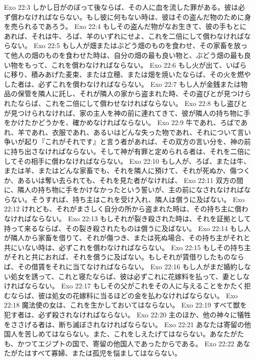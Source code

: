Exo 22:3  しかし日がのぼって後ならば、その人に血を流した罪がある。彼は必ず償わなければならない。もし彼に何もない時は、彼はその盗んだ物のために身を売られるであろう。
Exo 22:4  もしその盗んだ物がなお生きて、彼の手もとにあれば、それは牛、ろば、羊のいずれにせよ、これを二倍にして償わなければならない。
Exo 22:5  もし人が畑またはぶどう畑のものを食わせ、その家畜を放って他人の畑のものを食わせた時は、自分の畑の最も良い物と、ぶどう畑の最も良い物をもって、これを償わなければならない。
Exo 22:6  もし火が出て、いばらに移り、積みあげた麦束、または立穂、または畑を焼いたならば、その火を燃やした者は、必ずこれを償わなければならない。
Exo 22:7  もし人が金銭または物品の保管を隣人に託し、それが隣人の家から盗まれた時、その盗びとが見つけられたならば、これを二倍にして償わせなければならない。
Exo 22:8  もし盗びとが見つけられなければ、家の主人を神の前に連れてきて、彼が隣人の持ち物に手をかけたかどうかを、確かめなければならない。
Exo 22:9  牛であれ、ろばであれ、羊であれ、衣服であれ、あるいはどんな失った物であれ、それについて言い争いが起り『これがそれです』と言う者があれば、その双方の言い分を、神の前に持ち出さなければならない。そして神が有罪と定められる者は、それを二倍にしてその相手に償わなければならない。
Exo 22:10  もし人が、ろば、または牛、または羊、またはどんな家畜でも、それを隣人に預けて、それが死ぬか、傷つくか、あるいは奪い去られても、それを見た者がなければ、
Exo 22:11  双方の間に、隣人の持ち物に手をかけなかったという誓いが、主の前になされなければならない。そうすれば、持ち主はこれを受け入れ、隣人は償うに及ばない。
Exo 22:12  けれども、それがまさしく自分の所から盗まれた時は、その持ち主に償わなければならない。
Exo 22:13  もしそれが裂き殺された時は、それを証拠として持って来るならば、その裂き殺されたものは償うに及ばない。
Exo 22:14  もし人が隣人から家畜を借りて、それが傷つき、または死ぬ場合、その持ち主がそれと共にいない時は、必ずこれを償わなければならない。
Exo 22:15  もしその持ち主がそれと共におれば、それを償うに及ばない。もしそれが賃借りしたものならば、その借賃をそれに当てなければならない。
Exo 22:16  もし人がまだ婚約しない処女を誘って、これと寝たならば、彼は必ずこれに花嫁料を払って、妻としなければならない。
Exo 22:17  もしその父がこれをその人に与えることをかたく拒むならば、彼は処女の花嫁料に当るほどの金を払わなければならない。
Exo 22:18  魔法使の女は、これを生かしておいてはならない。
Exo 22:19  すべて獣を犯す者は、必ず殺されなければならない。
Exo 22:20  主のほか、他の神々に犠牲をささげる者は、断ち滅ぼされなければならない。
Exo 22:21  あなたは寄留の他国人を苦しめてはならない。また、これをしえたげてはならない。あなたがたも、かつてエジプトの国で、寄留の他国人であったからである。
Exo 22:22  あなたがたはすべて寡婦、または孤児を悩ましてはならない。
